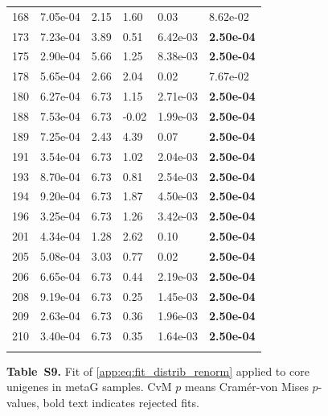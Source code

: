 \begin{figure}[htbp!]
{\begin{minipage}[t]{0.48\linewidth}
\begin{tabular}{llllll}
                    168 & 7.05e-04 & 2.15 & 1.60 & 0.03 & 8.62e-02\\
                    173 & 7.23e-04 & 3.89 & 0.51 & 6.42e-03 & \textbf{2.50e-04}\\
                    175 & 2.90e-04 & 5.66 & 1.25 & 8.38e-03 & \textbf{2.50e-04}\\
                    178 & 5.65e-04 & 2.66 & 2.04 & 0.02 & 7.67e-02\\
                    180 & 6.27e-04 & 6.73 & 1.15 & 2.71e-03 & \textbf{2.50e-04}\\
                    188 & 7.53e-04 & 6.73 & -0.02 & 1.99e-03 & \textbf{2.50e-04}\\
                    189 & 7.25e-04 & 2.43 & 4.39 & 0.07 & \textbf{2.50e-04}\\
                    191 & 3.54e-04 & 6.73 & 1.02 & 2.04e-03 & \textbf{2.50e-04}\\
                    193 & 8.70e-04 & 6.73 & 0.81 & 2.54e-03 & \textbf{2.50e-04}\\
                    194 & 9.20e-04 & 6.73 & 1.87 & 4.50e-03 & \textbf{2.50e-04}\\
                    196 & 3.25e-04 & 6.73 & 1.26 & 3.42e-03 & \textbf{2.50e-04}\\
                    201 & 4.34e-04 & 1.28 & 2.62 & 0.10 & \textbf{2.50e-04}\\
                    205 & 5.08e-04 & 3.03 & 0.77 & 0.02 & \textbf{2.50e-04}\\
                    206 & 6.65e-04 & 6.73 & 0.44 & 2.19e-03 & \textbf{2.50e-04}\\
                    208 & 9.19e-04 & 6.73 & 0.25 & 1.45e-03 & \textbf{2.50e-04}\\
                    209 & 2.63e-04 & 6.73 & 0.36 & 1.96e-03 & \textbf{2.50e-04}\\
                    210 & 3.40e-04 & 6.73 & 0.35 & 1.64e-03 & \textbf{2.50e-04}\\
                     &  &  &  &  & \\
        \bottomrule
        \end{tabular}
    \end{minipage}
    }
    \caption*{\textbf{Table~S9.} Fit of \eqref{app:eq:fit_distrib_renorm} applied to core unigenes in metaG samples. CvM $p$ means Cram\'er-von Mises $p$-values, bold text indicates rejected fits.}
    \label{subtab:app:core:metaG:core}
\end{figure}